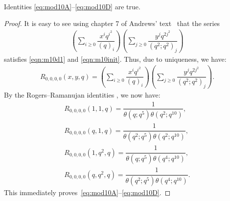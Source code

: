 \begin{thm}
Identities \eqref{eq:mod10A}--\eqref{eq:mod10D} are true.
\end{thm}
\begin{proof}
It is easy to see using chapter 7 of Andrews' text~\cite{And-book} that 
the series  
\begin{align}
\left(\sum_{i\geq 0} \dfrac{x^iq^{i^2}}{(q)_i}\right)
\left(\sum_{j\geq 0} \dfrac{y^jq^{2j^2}}{(q^2;q^2)_j}\right)
\end{align}
satisfies \eqref{eqn:m10d1} and \eqref{eqn:m10init}.
Thus, due to uniqueness, we have:
\begin{align}
R_{0,0,0,0}(x,y,q)=\left(\sum_{i\geq 0} \dfrac{x^iq^{i^2}}{(q)_i}\right)
\left(\sum_{j\geq 0} \dfrac{y^jq^{2j^2}}{(q^2;q^2)_j}\right).
\end{align}
By the Rogers--Ramanujan identities \cite[Ch.\ 7]{And-book}, we now have:
\begin{align}
R_{0,0,0,0}(1,1,q)=\dfrac{1}{\theta(q;q^5)\theta(q^2;q^{10})},\\
R_{0,0,0,0}(q,1,q)=\dfrac{1}{\theta(q^2;q^5)\theta(q^2;q^{10})},\\
R_{0,0,0,0}(1,q^2,q)=\dfrac{1}{\theta(q;q^5)\theta(q^4;q^{10})},\\
R_{0,0,0,0}(q,q^2,q)=\dfrac{1}{\theta(q^2;q^5)\theta(q^4;q^{10})}.
\end{align}
This immediately proves~\eqref{eq:mod10A}--\eqref{eq:mod10D}.
\end{proof}
